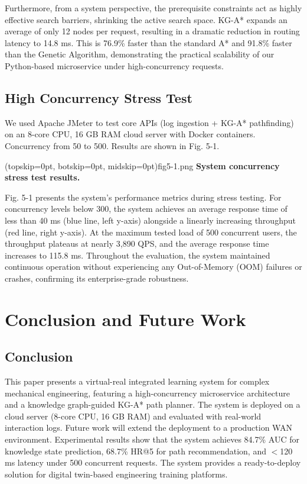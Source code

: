 \documentclass{ieeeaccess}
\begin{document}
Furthermore, from a system perspective, the prerequisite constraints act as highly effective search barriers, shrinking the active search space. KG-A* expands an average of only 12 nodes per request, resulting in a dramatic reduction in routing latency to 14.8 ms. This is 76.9\% faster than the standard A* and 91.8\% faster than the Genetic Algorithm, demonstrating the practical scalability of our Python-based microservice under high-concurrency requests.

\subsection{High Concurrency Stress Test}
We used Apache JMeter to test core APIs (log ingestion + KG-A* pathfinding) on an 8-core CPU, 16 GB RAM cloud server with Docker containers. Concurrency from 50 to 500. Results are shown in Fig. 5-1.

\Figure[t!](topskip=0pt, botskip=0pt, midskip=0pt){fig5-1.png}
{ \textbf{System concurrency stress test results.}\label{fig5-1}}

Fig. 5-1 presents the system's performance metrics during stress testing. For concurrency levels below 300, the system achieves an average response time of less than 40 ms (blue line, left y-axis) alongside a linearly increasing throughput (red line, right y-axis). At the maximum tested load of 500 concurrent users, the throughput plateaus at nearly 3,890 QPS, and the average response time increases to 115.8 ms. Throughout the evaluation, the system maintained continuous operation without experiencing any Out-of-Memory (OOM) failures or crashes, confirming its enterprise-grade robustness.

\section{Conclusion and Future Work}
\label{sec:conclusion}

\subsection{Conclusion}
This paper presents a virtual-real integrated learning system for complex mechanical engineering, featuring a high-concurrency microservice architecture and a knowledge graph-guided KG-A* path planner. The system is deployed on a cloud server (8-core CPU, 16 GB RAM) and evaluated with real-world interaction logs. Future work will extend the deployment to a production WAN environment. Experimental results show that the system achieves 84.7\% AUC for knowledge state prediction, 68.7\% HR@5 for path recommendation, and $<$120 ms latency under 500 concurrent requests. The system provides a ready-to-deploy solution for digital twin-based engineering training platforms.
\end{document}
